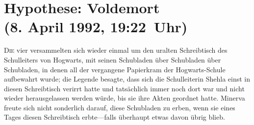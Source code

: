 \begin{headlines}
\label{American Mage:}


\label{Klitterer:}


\label{Tagesprophet:}

\end{headlines}

\section{Hypothese: Voldemort\\
(8. April 1992, 19:22~Uhr)}

\lettrine{D}{ie} vier versammelten sich wieder einmal um den uralten Schreibtisch des Schulleiters von Hogwarts, mit seinen Schubladen über Schubladen über Schubladen, in denen all der vergangene Papierkram der Hogwarts-Schule aufbewahrt wurde; die Legende besagte, dass sich die Schulleiterin Shehla einst in diesen Schreibtisch verirrt hatte und tatsächlich immer noch dort war und nicht wieder herausgelassen werden würde, bis sie ihre Akten geordnet hatte. Minerva freute sich nicht sonderlich darauf, diese Schubladen zu erben, wenn sie eines Tages diesen Schreibtisch erbte—falls überhaupt etwas davon übrig blieb.

